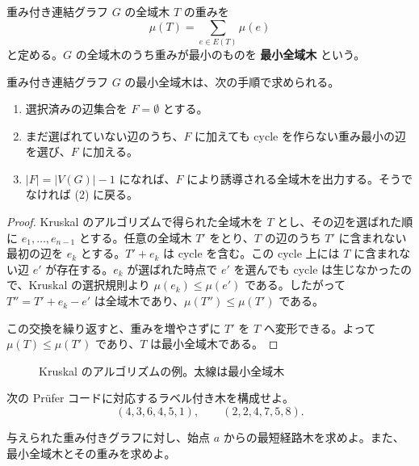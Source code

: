 \documentclass[article,paper=a4paper]{jlreq}
\begin{document}
\begin{dfn}
  重み付き連結グラフ $G$ の全域木 $T$ の重みを
  \[
    \mu(T)=\sum_{e\in E(T)}\mu(e)
  \]
  と定める。$G$ の全域木のうち重みが最小のものを \textbf{最小全域木} という。
\end{dfn}

\begin{prop}
  重み付き連結グラフ $G$ の最小全域木は、次の手順で求められる。
  \begin{enumerate}[label=(\arabic*)\, ]
    \item 選択済みの辺集合を $F=\emptyset$ とする。
    \item まだ選ばれていない辺のうち、$F$ に加えても cycle を作らない重み最小の辺を選び、$F$ に加える。
    \item $|F|=|V(G)|-1$ になれば、$F$ により誘導される全域木を出力する。そうでなければ (2) に戻る。
  \end{enumerate}
\end{prop}

\begin{proof}
  Kruskal のアルゴリズムで得られた全域木を $T$ とし、その辺を選ばれた順に $e_1,\ldots,e_{n-1}$ とする。任意の全域木 $T'$ をとり、$T$ の辺のうち $T'$ に含まれない最初の辺を $e_k$ とする。$T'+e_k$ は cycle を含む。この cycle 上には $T$ に含まれない辺 $e'$ が存在する。$e_k$ が選ばれた時点で $e'$ を選んでも cycle は生じなかったので、Kruskal の選択規則より $\mu(e_k)\leq\mu(e')$ である。したがって $T''=T'+e_k-e'$ は全域木であり、$\mu(T'')\leq\mu(T')$ である。

  この交換を繰り返すと、重みを増やさずに $T'$ を $T$ へ変形できる。よって $\mu(T)\leq\mu(T')$ であり、$T$ は最小全域木である。
\end{proof}

\begin{figure}[htbp]
  \centering
  \caption{Kruskal のアルゴリズムの例。太線は最小全域木}
\end{figure}

\begin{prob}
  次の Pr\"ufer コードに対応するラベル付き木を構成せよ。
  \[
    (4,3,6,4,5,1), \qquad (2,2,4,7,5,8).
  \]
\end{prob}

\begin{prob}
  与えられた重み付きグラフに対し、始点 $a$ からの最短経路木を求めよ。また、最小全域木とその重みを求めよ。
\end{prob}
\end{document}
